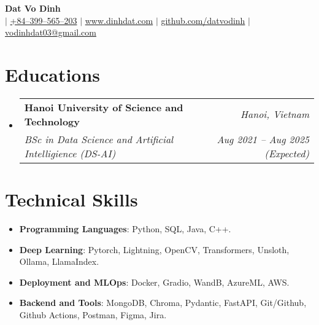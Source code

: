 \documentclass[letterpaper,11pt]{article}
\makeatletter
\newcommand{\resumeitem}[1]{
  \item\small{
    #1 \vspace{-2pt}
  }
}
\newcommand{\resumeSubheading}[4]{
  \vspace{-1pt}\item
    \begin{tabular*}{0.97\textwidth}[t]{l@{\extracolsep{\fill}}r}
      \textbf{#1} & \textit{#2} \\
      \textit{\small#3} & \textit{\small #4} \\
    \end{tabular*}\vspace{-6pt}
}
\newcommand{\resumeSubHeadingListStart}{\begin{itemize}[leftmargin=*,label={}]}
\newcommand{\resumeSubHeadingListEnd}{\end{itemize}}
\newcommand{\resumeItemListStart}{\begin{itemize}}
\newcommand{\resumeItemListEnd}{\end{itemize}\vspace{-5pt}}
\makeatother
\begin{document}

\begin{flushleft}
  \textbf{\huge {Dat Vo Dinh}} \\ \vspace{4pt}
   $|$ \href{tel:+84399565203}{{+84--399--565--203}} $|$ \href{https://dinhdat.com}{{www.dinhdat.com}}
  $|$ \href{https://github.com/datvodinh/}{{github.com/datvodinh}} $|$ \href{mailto:vodinhdat03@gmail.com}{{vodinhdat03@gmail.com}}
\end{flushleft}

\section{Educations}
  \resumeSubHeadingListStart
    \resumeSubheading
      {Hanoi University of Science and Technology}{\textit{Hanoi, Vietnam}}
      {BSc in Data Science and Artificial Intelligience (DS-AI)}{Aug 2021 -- Aug 2025 (Expected)}
  \resumeSubHeadingListEnd

  
\section{Technical Skills}
\resumeItemListStart[leftmargin=*,label={}]
  \resumeitem{\textbf{Programming Languages}: {Python, SQL, Java, C++.}} \\[-\baselineskip]
  \resumeitem{\textbf{Deep Learning}: {Pytorch, Lightning, OpenCV, Transformers, Unsloth, Ollama, LlamaIndex.}} \\[-\baselineskip]
  \resumeitem{\textbf{Deployment and MLOps}: {Docker, Gradio, WandB, AzureML, AWS.}} \\[-\baselineskip]
  \resumeitem{\textbf{Backend and Tools}: {MongoDB, Chroma, Pydantic, FastAPI, Git/Github, Github Actions, Postman, Figma, Jira.}} \\[-\baselineskip]
\resumeItemListEnd
\end{document}
